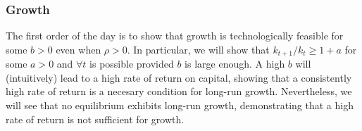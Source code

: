 \documentclass[11pt,letterpaper,reqno,oneside]{article}
\begin{document}
\subsubsection{Growth}
\label{sec:09Nov2015:olg:growth}

The first order of the day is to show that growth is technologically feasible for some $b>0$ even when $\rho>0$. In particular, we will show that $k_{t+1}/k_t \geq 1+a$ for some $a>0$ and $\forall t$ is possible provided $b$ is large enough. A high $b$ will (intuitively) lead to a high rate of return on capital, showing that a consistently high rate of return is a necesary condition for long-run growth. Nevertheless, we will see that no equilibrium exhibits long-run growth, demonstrating that a high rate of return is not sufficient for growth.
\end{document}
